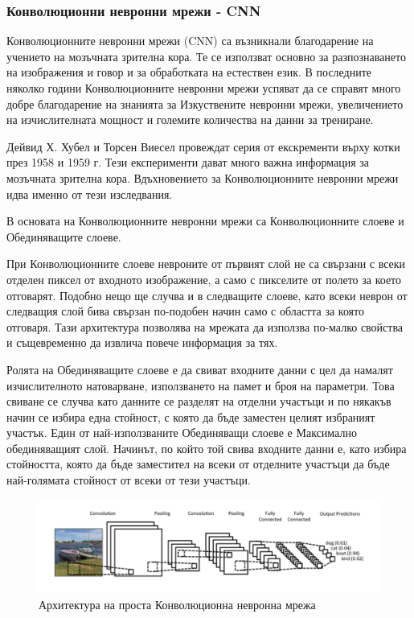 \documentclass{article}
\begin{document}
    \subsubsection{Конволюционни невронни мрежи - CNN}

    Конволюционните невронни мрежи (CNN) са възникнали благодарение на учението на мозъчната зрителна кора. Те се използват
    основно за разпознаването на изображения и говор и за обработката на естествен език. В последните няколко години
    Конволюционните невронни мрежи успяват да се справят много добре благодарение на знанията за Изкуствените невронни
    мрежи, увеличението на изчислителната мощност и големите количества на данни за трениране.

    Дейвид Х. Хубел и Торсен Виесел провеждат серия от екскременти върху котки през 1958 и 1959 г. Тези експерименти дават
    много важна информация за мозъчната зрителна кора. Вдъхновението за Конволюционните невронни мрежи идва именно от тези
    изследвания.

    В основата на Конволюционните невронни мрежи са Конволюционните слоеве и Обединяващите слоеве.

    При Конволюционните слоеве невроните от първият слой не са свързани с всеки отделен пиксел от входното изображение, а
    само с пикселите от полето за което отговарят. Подобно нещо ще случва и в следващите слоеве, като всеки неврон от
    следващия слой бива свързан по-подобен начин само с областта за която отговаря. Тази архитектура позволява на мрежата
    да използва по-малко свойства и същевременно да извлича повече информация за тях.

    Ролята на Обединяващите слоеве е да свиват входните данни с цел да намалят изчислителното натоварване, използването на
    памет и броя на параметри. Това свиване се случва като данните се разделят на отделни участъци и по някакъв начин се
    избира една стойност, с която да бъде заместен целият избраният участък. Един от най-използваните Обединяващи слоеве е
    Максимално обединяващият слой. Начинът, по който той свива входните данни е, като избира стойността, която да бъде
    заместител на всеки от отделните участъци да бъде най-голямата стойност от всеки от тези участъци. \cite{hands-on-ml}

    \begin{figure}[H]
        \centering
        \captionsetup{justification=centering}
        \includegraphics[width=450px, keepaspectratio]{chapter-03/cnn.png}
        \caption{Архитектура на проста Конволюционна невронна мрежа}
    \end{figure}
\end{document}
